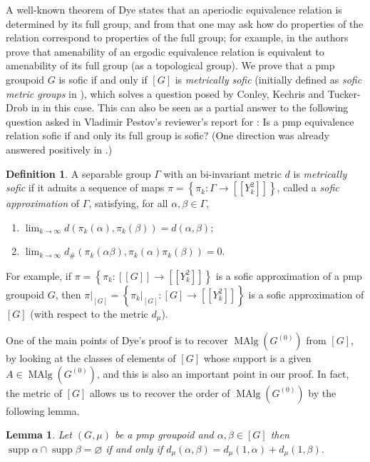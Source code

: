 \documentclass[11pt]{amsart}
\theoremstyle{plain}    \newtheorem{theorem}[generalnumbering]{Theorem}
\theoremstyle{plain}    \newtheorem{corollary}[generalnumbering]{Corollary}
\theoremstyle{definition}   \newtheorem{definition}[generalnumbering]{Definition}
\theoremstyle{definition}   \newtheorem{example}[generalnumbering]{Example}
\theoremstyle{plain}    \newtheorem{proposition}[generalnumbering]{Proposition}
\theoremstyle{plain}    \newtheorem{lemma}[generalnumbering]{Lemma}
\theoremstyle{plain}    \newtheorem{plainstyle}[generalnumbering]{\namefordifferentenvironment}
\theoremstyle{plain}    \newtheorem*{plainstyle*}{\namefordifferentenvironment}
\theoremstyle{definition}    \newtheorem{definitionstyle}[generalnumbering]{\namefordifferentenvironment}
\theoremstyle{definition}    \newtheorem*{definitionstyle*}{\namefordifferentenvironment}
\begin{document}
A well-known theorem of Dye \cite{MR0158048} states that an aperiodic equivalence relation is determined by its full group, and from that one may ask how do properties of the relation correspond to properties of the full group; for example, in \cite[Theorem 5.7]{MR2311665} the authors prove that amenability of an ergodic equivalence relation is equivalent to amenability of its full group (as a topological group). We prove that a pmp groupoid $G$ is sofic if and only if $[G]$ is \emph{metrically sofic} (initially defined as \emph{sofic metric groups} in \cite{arxiv1206.5473v3}), which solves a question posed by Conley, Kechris and Tucker-Drob in \cite{MR3035288} in this case. This can also be seen as a partial answer to the following question asked in Vladimir Pestov's reviewer's report for \cite{MR2566316}: Is a pmp equivalence relation sofic if and only its full group is sofic? (One direction was already answered positively in \cite{MR3314104}.)

\begin{definition}\label{definitionmetricallysofic}
A separable group $\Gamma$ with an bi-invariant metric $d$ is \emph{metrically sofic} if it admits a sequence of maps $\pi=\left\{\pi_k:\Gamma \to[[Y_k^2]]\right\}$, called a \emph{sofic approximation} of $\Gamma$, satisfying, for all $\alpha,\beta\in\Gamma$,
\begin{enumerate}[label=(\roman*)]
\item $\lim_{k\to\infty}d(\pi_k(\alpha),\pi_k(\beta))=d(\alpha,\beta)$;
\item $\lim_{k\to\infty}d_\#(\pi_k(\alpha\beta),\pi_k(\alpha)\pi_k(\beta))=0$.
\end{enumerate}
\end{definition}

For example, if $\pi=\left\{\pi_k:[[G]]\to[[Y_k^2]]\right\}$ is a sofic approximation of a pmp groupoid $G$, then $\pi|_{[G]}=\left\{\pi_k|_{[G]}:[G]\to[[Y_k^2]]\right\}$ is a sofic approximation of $[G]$ (with respect to the metric $d_\mu$).

One of the main points of Dye's proof is to recover $\operatorname{MAlg}(G^{(0)})$ from $[G]$, by looking at the classes of elements of $[G]$ whose support is a given $A\in\operatorname{MAlg}(G^{(0)})$, and this is also an important point in our proof. In fact, the metric of $[G]$ allows us to recover the order of $\operatorname{MAlg}(G^{(0)})$ by the following lemma.

\begin{lemma}\label{lemmasupports}
Let $(G,\mu)$ be a pmp groupoid and $\alpha,\beta\in[G]$ then $\operatorname{supp}\alpha\cap\operatorname{supp}\beta=\varnothing$ if and only if $d_\mu(\alpha,\beta)=d_\mu(1,\alpha)+d_\mu(1,\beta)$.
\end{lemma}
\end{document}
